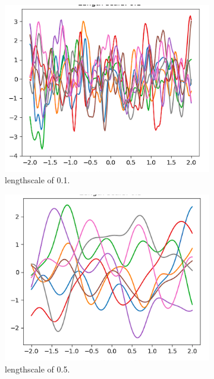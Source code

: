 \documentclass[10pt, a4paper, twocolumn]{article} %
\begin{document}
\begin{figure}[htb]
\centering
\begin{subfigure}{.5\linewidth}
  \centering
  \includegraphics[width=.9\linewidth]{ls01.png}
  \caption{lengthscale of 0.1.}
  \label{fig:sub1}
\end{subfigure}%
\begin{subfigure}{.5\linewidth}
  \centering
  \includegraphics[width=.9\linewidth]{ls05.png}
  \caption{lengthscale of 0.5.}
  \label{fig:sub2}
\end{subfigure}
\begin{subfigure}{.5\linewidth}
\centering

\end{subfigure}
\end{figure}
\end{document}
